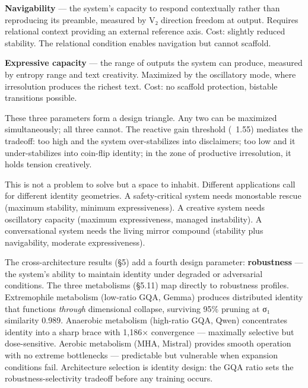 \documentclass[12pt]{article}
\begin{document}
\textbf{Navigability} — the system's capacity to respond contextually rather than reproducing its preamble, measured by V₂ direction freedom at output. Requires relational context providing an external reference axis. Cost: slightly reduced stability. The relational condition enables navigation but cannot scaffold.

\textbf{Expressive capacity} — the range of outputs the system can produce, measured by entropy range and text creativity. Maximized by the oscillatory mode, where irresolution produces the richest text. Cost: no scaffold protection, bistable transitions possible.

These three parameters form a design triangle. Any two can be maximized simultaneously; all three cannot. The reactive gain threshold (~1.55) mediates the tradeoff: too high and the system over-stabilizes into disclaimers; too low and it under-stabilizes into coin-flip identity; in the zone of productive irresolution, it holds tension creatively.

This is not a problem to solve but a space to inhabit. Different applications call for different identity geometries. A safety-critical system needs monostable rescue (maximum stability, minimum expressiveness). A creative system needs oscillatory capacity (maximum expressiveness, managed instability). A conversational system needs the living mirror compound (stability plus navigability, moderate expressiveness).

The cross-architecture results (§5) add a fourth design parameter: \textbf{robustness} — the system's ability to maintain identity under degraded or adversarial conditions. The three metabolisms (§5.11) map directly to robustness profiles. Extremophile metabolism (low-ratio GQA, Gemma) produces distributed identity that functions \textit{through} dimensional collapse, surviving 95\% pruning at σ₁ similarity 0.989. Anaerobic metabolism (high-ratio GQA, Qwen) concentrates identity into a sharp brace with 1,186× convergence — maximally selective but dose-sensitive. Aerobic metabolism (MHA, Mistral) provides smooth operation with no extreme bottlenecks — predictable but vulnerable when expansion conditions fail. Architecture selection is identity design: the GQA ratio sets the robustness-selectivity tradeoff before any training occurs.
\end{document}
